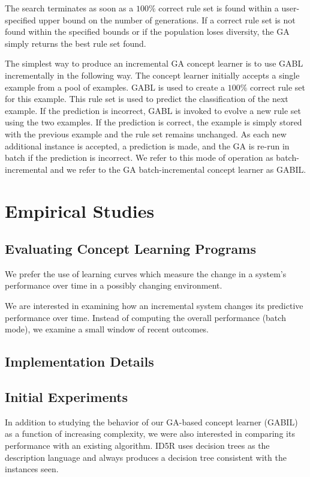 \documentclass[12pt]{book}
\begin{document}
The search terminates as soon as a $100\%$ correct rule set is found within a user-specified upper bound on the number of generations. If a correct rule set is not found within the specified bounds or if the population loses diversity, the GA simply returns the best rule set found.

The simplest way to produce an incremental GA concept learner is to use GABL incrementally in the following way. The concept learner initially accepts a single example from a pool of examples. GABL is used to create a $100\%$ correct rule set for this example. This rule set is used to predict the classification of the next example. If the prediction is incorrect, GABL is invoked to evolve a new rule set using the two examples. If the prediction is correct, the example is simply stored with the previous example and the rule set remains unchanged. As each new additional instance is accepted, a prediction is made, and the GA is re-run in batch if the prediction is incorrect. We refer to this mode of operation as batch-incremental and we refer to the GA batch-incremental concept learner as GABIL.

\section{Empirical Studies}
\subsection{Evaluating Concept Learning Programs}
We prefer the use of learning curves which measure the change in a system's performance over time in a possibly changing environment.

We are interested in examining how an incremental system changes its predictive performance over time. Instead of computing the overall performance (batch mode), we examine a small window of recent outcomes.

\subsection{Implementation Details}

\subsection{Initial Experiments}
In addition to studying the behavior of our GA-based concept learner (GABIL) as a function of increasing complexity, we were also interested in comparing its performance with an existing algorithm. ID5R uses decision trees as the description language and always produces a decision tree consistent with the instances seen.
\end{document}
